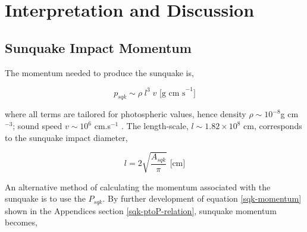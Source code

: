 \section{Interpretation and Discussion}
\subsection{Sunquake Impact Momentum}
The momentum needed to produce the sunquake is,

\begin{equation}\label{sqk-momentum} 
p_{sqk}\sim \rho \; l^{3} \; v \text{ [g cm s}^{-1}]
\end{equation}

\noindent
where all terms are tailored for photospheric values, hence density $\rho \sim 10^{-8}$g cm$^{-3}$; sound speed $v \sim 10^{6}$ cm.s$^{-1}$ \citep{2015ApJ...807..102S}. The length-scale, $l \sim  1.82{\times}10^{8}$ cm, corresponds to the sunquake impact diameter, 

\begin{equation}\label{lengthscale}
l = 2\sqrt{\frac{A_{sqk}}{\pi}} \text{ [cm]}
\end{equation}

\noindent
An alternative method of calculating the momentum associated with the sunquake is to use the $P_{sqk}$. By further development of equation \ref{sqk-momentum} shown in the Appendices section \ref{sqk-ptoP-relation}, sunquake momentum becomes,  

